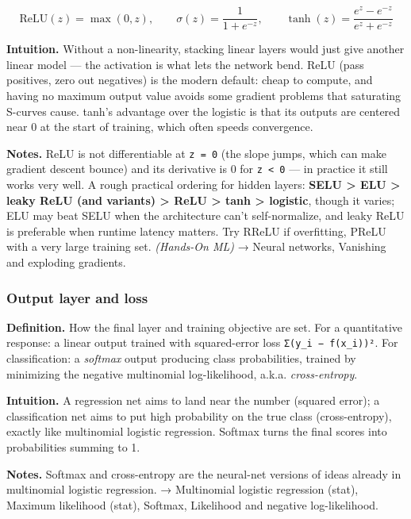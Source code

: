 \documentclass[
  10pt,
  letterpaper,
  onecolumn]{article}
\begin{document}
\begin{equation*}
\mathrm{ReLU}(z)=\max(0,z),
\qquad
\sigma(z)=\frac{1}{1+e^{-z}},
\qquad
\tanh(z)=\frac{e^{z}-e^{-z}}{e^{z}+e^{-z}}
\end{equation*}

\textbf{Intuition.} Without a non-linearity, stacking linear layers
would just give another linear model --- the activation is what lets the
network bend. ReLU (pass positives, zero out negatives) is the modern
default: cheap to compute, and having no maximum output value avoids
some gradient problems that saturating S-curves cause. tanh's advantage
over the logistic is that its outputs are centered near 0 at the start
of training, which often speeds convergence.

\textbf{Notes.} ReLU is not differentiable at \texttt{z\ =\ 0} (the
slope jumps, which can make gradient descent bounce) and its derivative
is 0 for \texttt{z\ \textless{}\ 0} --- in practice it still works very
well. A rough practical ordering for hidden layers: \textbf{SELU
\textgreater{} ELU \textgreater{} leaky ReLU (and variants)
\textgreater{} ReLU \textgreater{} tanh \textgreater{} logistic}, though
it varies; ELU may beat SELU when the architecture can't self-normalize,
and leaky ReLU is preferable when runtime latency matters. Try RReLU if
overfitting, PReLU with a very large training set. \emph{(Hands-On ML)}
→ Neural networks, Vanishing and exploding gradients.

\hypertarget{output-layer-and-loss}{%
\subsubsection{Output layer and loss}\label{output-layer-and-loss}}

\textbf{Definition.} How the final layer and training objective are set.
For a quantitative response: a linear output trained with squared-error
loss \texttt{Σ(y\_i\ −\ f(x\_i))²}. For classification: a \emph{softmax}
output producing class probabilities, trained by minimizing the negative
multinomial log-likelihood, a.k.a. \emph{cross-entropy}.

\textbf{Intuition.} A regression net aims to land near the number
(squared error); a classification net aims to put high probability on
the true class (cross-entropy), exactly like multinomial logistic
regression. Softmax turns the final scores into probabilities summing to
1.

\textbf{Notes.} Softmax and cross-entropy are the neural-net versions of
ideas already in multinomial logistic regression. → Multinomial logistic
regression (stat), Maximum likelihood (stat), Softmax, Likelihood and
negative log-likelihood.
\end{document}
